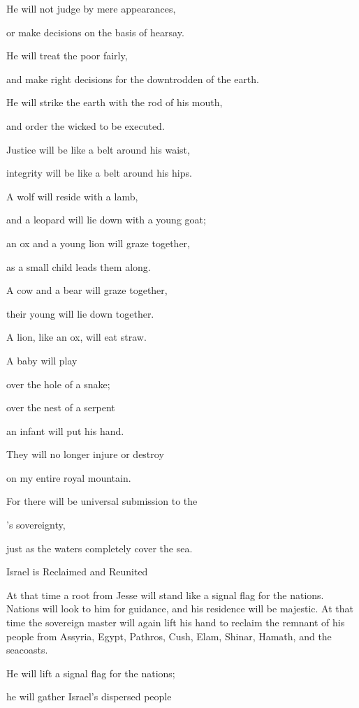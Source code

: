 {\par }{\Q He will not
judge
by mere appearances,
\par }{\Q or make decisions
on the basis
of hearsay.
\par }{\Q {}He will treat
the poor
fairly,
\par }{\Q and make
right decisions
for the downtrodden
of the earth.
\par }{\Q He will strike
the earth
with the rod
of his mouth,
\par }{\Q and order the wicked
to be executed.
\par }{\Q {}Justice
will be
like a belt
around his waist,
\par }{\Q integrity
will be like a belt
around his hips.
\par }{\Q {}A wolf
will reside
with
a lamb,
\par }{\Q and a leopard
will lie down
with
a young goat;
\par }{\Q an ox
and a young lion
will graze
together,
\par }{\Q as a small
child
leads them along.
\par }{\Q {}A cow
and a bear
will graze
together,
\par }{\Q their young
will lie
down together.

\par }{\Q A lion,
like an ox,
will eat
straw.
\par }{\Q {}A baby
will play
\par }{\Q over
the hole
of a snake;
\par }{\Q over
the nest
of a serpent
\par }{\Q an infant
will put
his hand.
\par }{\Q {}They will no
longer injure
or
destroy
\par }{\Q on my entire
royal mountain.
\par }{\Q For
there will be universal
submission
to the

{}’s
sovereignty,
\par }{\Q just as the waters
completely cover
the sea.
\par }{\SH Israel is Reclaimed and Reunited
\par }{\PP {}At that time
a root
from Jesse
will stand
like a signal flag
for the nations.
Nations
will look to him for guidance,
and his residence
will be
majestic.
At that
time
the sovereign master
will
again
lift
his hand
to reclaim
the remnant
of his people
from Assyria,
Egypt,
Pathros,
Cush,
Elam,
Shinar,
Hamath,
and the seacoasts.
\par }{\Q {}He will lift
a signal flag
for the nations;
\par }{\Q he will gather
Israel’s
dispersed
people

}
